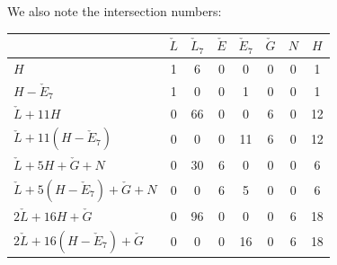 \documentclass[12pt]{amsart}
\theoremstyle{definition}
\renewcommand{\geq}{\geqslant}
\renewcommand{\leq}{\leqslant}
\newcommand{\?}{ \circled{{\large\bf ?}}}
\begin{document}





We also note the intersection numbers:
\begin{center} \begin{tabular}{|l|c|c|c|c|c|c|c|}
	\hline 
	& $\check L$& $\check L_7$& $\check E$& $\check E_7$& $\check G$& $N$& $H$\\
	\hline\hline
	$H$& 1&6&0&0&0&0&1\\
	\hline 
	$H-\check E_7$& 1&0&0&1&0&0&1\\
	\hline 
	$\check L+11H$& 0&66&0&0&6&0&12\\ 
	\hline 
	$\check L+11(H-\check E_7)$&0&0&0&11&6&0&12\\
	\hline 
	$\check L+5H+\check G+N$& 0&30&6&0&0&0&6\\
	\hline
	$\check L+5(H-\check E_7)+\check G+N$& 0&0&6&5&0&0&6\\
	\hline 
	$2\check L+16H+\check G$& 0&96&0&0&0&6&18\\
	\hline
	$2\check L+16(H-\check E_7)+\check G$&0&0&0&16&0&6&18\\
	\hline 
\end{tabular}
\end{center}
\end{document}
